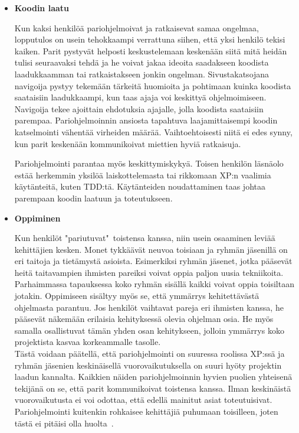 \documentclass[finnish]{../tktltiki2}
\theoremstyle{definition}
\theoremstyle{remark}
\begin{document}
\begin{itemize}

\item {\bf Koodin laatu}

Kun kaksi henkilöä pariohjelmoivat ja ratkaisevat samaa ongelmaa, lopputulos on usein tehokkaampi verrattuna siihen, että yksi henkilö tekisi kaiken. Parit pystyvät helposti keskustelemaan keskenään siitä mitä heidän tulisi seuraavaksi tehdä ja he voivat jakaa ideoita saadakseen koodista laadukkaamman tai ratkaistakseen jonkin ongelman. Sivustakatsojana navigoija pystyy tekemään tärkeitä huomioita ja pohtimaan kuinka koodista saataisiin laadukkaampi, kun taas ajaja voi keskittyä ohjelmoimiseen. Navigoija tekee ajoittain ehdotuksia ajajalle, jolla koodista saataisiin parempaa.
Pariohjelmoinnin ansiosta tapahtuva laajamittaisempi koodin katselmointi vähentää virheiden määrää. Vaihtoehtoisesti
niitä ei edes synny, kun parit keskenään kommunikoivat miettien hyviä ratkaisuja.

Pariohjelmointi parantaa myös keskittymiskykyä. Toisen henkilön läsnäolo estää herkemmin yksilöä laiskottelemasta tai rikkomaan XP:n
vaalimia käytänteitä, kuten TDD:tä. Käytänteiden noudattaminen taas johtaa parempaan koodin laatuun ja toteutukseen.

\item {\bf Oppiminen}

Kun henkilöt "pariutuvat"~toistensa kanssa, niin usein osaaminen leviää kehittäjien kesken. Monet tykkäävät neuvoa toisiaan ja ryhmän jäsenillä
on eri taitoja ja tietämystä asioista. Esimerkiksi ryhmän jäsenet, jotka pääsevät heitä taitavampien ihmisten pareiksi voivat oppia
paljon uusia tekniikoita. Parhaimmassa tapauksessa koko ryhmän sisällä kaikki voivat oppia toisiltaan jotakin.
Oppimiseen sisältyy myös se, että ymmärrys kehitettävästä ohjelmasta parantuu. Jos henkilöt vaihtavat
pareja eri ihmisten kanssa, he pääsevät näkemään erilaisia kehityksessä olevia ohjelman osia. He myös samalla osallistuvat tämän yhden osan
kehitykseen, jolloin ymmärrys koko projektista kasvaa korkeammalle tasolle.\\

Tästä voidaan päätellä, että pariohjelmointi on suuressa roolissa XP:ssä ja ryhmän jäsenien keskinäisellä vuorovaikutuksella on suuri hyöty projektin laadun kannalta. Kaikkien näiden pariohjelmoinnin hyvien puolien yhteisenä tekijänä on se, että parit kommunikoivat toistensa kanssa. Ilman keskinäistä vuorovaikutusta ei voi odottaa, että edellä mainitut asiat toteutuisivat. Pariohjelmointi kuitenkin rohkaisee kehittäjiä puhumaan toisilleen, joten tästä ei pitäisi olla huolta~\cite{Zarb:2012:UCW:2384716.2384738}.

\end{itemize}
\end{document}
